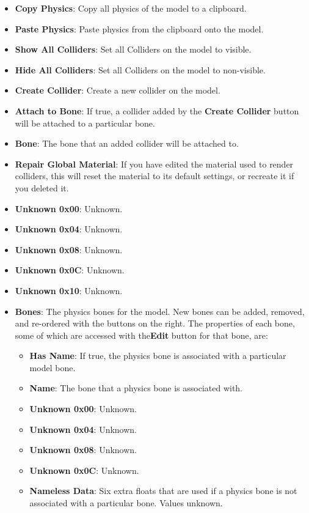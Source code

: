 \documentclass{article}
\begin{document}
\begin{itemize}
\item \textbf{Copy Physics}: Copy all physics of the model to a clipboard.
\item \textbf{Paste Physics}: Paste physics from the clipboard onto the model.
\item \textbf{Show All Colliders}: Set all Colliders on the model to visible.
\item \textbf{Hide All Colliders}: Set all Colliders on the model to non-visible.
\item \textbf{Create Collider}: Create a new collider on the model.
\item \textbf{Attach to Bone}: If true, a collider added by the \textbf{Create Collider} button will be attached to a particular bone.
\item \textbf{Bone}: The bone that an added collider will be attached to.
\item \textbf{Repair Global Material}: If you have edited the material used to render colliders, this will reset the material to its default settings, or recreate it if you deleted it.
\item \textbf{Unknown 0x00}: Unknown.
\item \textbf{Unknown 0x04}: Unknown.
\item \textbf{Unknown 0x08}: Unknown.
\item \textbf{Unknown 0x0C}: Unknown.
\item \textbf{Unknown 0x10}: Unknown.
\item \textbf{Bones}: The physics bones for the model. New bones can be added, removed, and re-ordered with the buttons on the right. The properties of each bone, some of which are accessed with the\textbf{Edit} button for that bone, are:
\begin{itemize}
\item \textbf{Has Name}: If true, the physics bone is associated with a particular model bone.
\item \textbf{Name}: The bone that a physics bone is associated with.
\item \textbf{Unknown 0x00}: Unknown.
\item \textbf{Unknown 0x04}: Unknown.
\item \textbf{Unknown 0x08}: Unknown.
\item \textbf{Unknown 0x0C}: Unknown.
\item \textbf{Nameless Data}: Six extra floats that are used if a physics bone is not associated with a particular bone. Values unknown.

\end{itemize}
\end{itemize}
\end{document}
